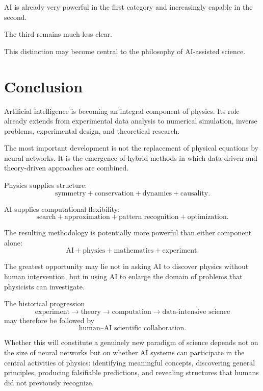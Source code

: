 \documentclass[11pt,a4paper]{article}
\begin{document}
AI is already very powerful in the first category and increasingly capable in
the second.

The third remains much less clear.

This distinction may become central to the philosophy of AI-assisted science.

\section{Conclusion}

Artificial intelligence is becoming an integral component of physics. Its role
already extends from experimental data analysis to numerical simulation,
inverse problems, experimental design, and theoretical research.

The most important development is not the replacement of physical equations by
neural networks. It is the emergence of hybrid methods in which data-driven and
theory-driven approaches are combined.

Physics supplies structure:
\begin{equation}
\text{symmetry}+\text{conservation}+\text{dynamics}+\text{causality}.
\end{equation}

AI supplies computational flexibility:
\begin{equation}
\text{search}+\text{approximation}+\text{pattern recognition}
+\text{optimization}.
\end{equation}

The resulting methodology is potentially more powerful than either component
alone:
\begin{equation}
\boxed{
\text{AI}+\text{physics}+\text{mathematics}+\text{experiment}.
}
\end{equation}

The greatest opportunity may lie not in asking AI to discover physics without
human intervention, but in using AI to enlarge the domain of problems that
physicists can investigate.

The historical progression
\begin{equation}
\text{experiment}
\rightarrow
\text{theory}
\rightarrow
\text{computation}
\rightarrow
\text{data-intensive science}
\end{equation}
may therefore be followed by
\begin{equation}
\boxed{
\text{human--AI scientific collaboration}.
}
\end{equation}

Whether this will constitute a genuinely new paradigm of science depends not
on the size of neural networks but on whether AI systems can participate in the
central activities of physics: identifying meaningful concepts, discovering
general principles, producing falsifiable predictions, and revealing structures
that humans did not previously recognize.
\end{document}

